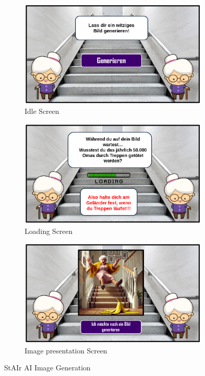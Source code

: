 \documentclass{article}
\begin{document}
\begin{figure}[H]
    \centering
    \begin{subfigure}[H]{0.8\textwidth}
        \centering
        \includegraphics[width=\textwidth]{./resources/StairImgAI_1.png}
        \caption{Idle Screen}
    \end{subfigure}
    \hfill
    \begin{subfigure}[H]{0.8\textwidth}
        \centering
        \includegraphics[width=\textwidth]{./resources/StairImgAI_2.png}
        \caption{Loading Screen}
    \end{subfigure}
    \hfill
    \begin{subfigure}[H]{0.8\textwidth}
        \centering
        \includegraphics[width=\textwidth]{./resources/StairImgAI_3.png}
        \caption{Image presentation Screen}
    \end{subfigure}
    \caption{StAIr AI Image Generation}
    \label{fig:StairImgAI}
\end{figure}
\end{document}
